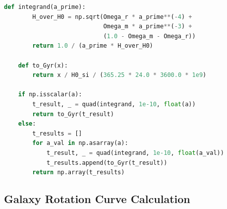 \begin{lstlisting}[language=Python, caption=QR Hubble Parameter Function]
    def integrand(a_prime):
        H_over_H0 = np.sqrt(Omega_r * a_prime**(-4) +
                            Omega_m * a_prime**(-3) +
                            (1.0 - Omega_m - Omega_r))
        return 1.0 / (a_prime * H_over_H0)

    def to_Gyr(x):
        return x / H0_si / (365.25 * 24.0 * 3600.0 * 1e9)

    if np.isscalar(a):
        t_result, _ = quad(integrand, 1e-10, float(a))
        return to_Gyr(t_result)
    else:
        t_results = []
        for a_val in np.asarray(a):
            t_result, _ = quad(integrand, 1e-10, float(a_val))
            t_results.append(to_Gyr(t_result))
        return np.array(t_results)
\end{lstlisting}

\subsection{Galaxy Rotation Curve Calculation}
\label{subsec:rotation-curve-code}

